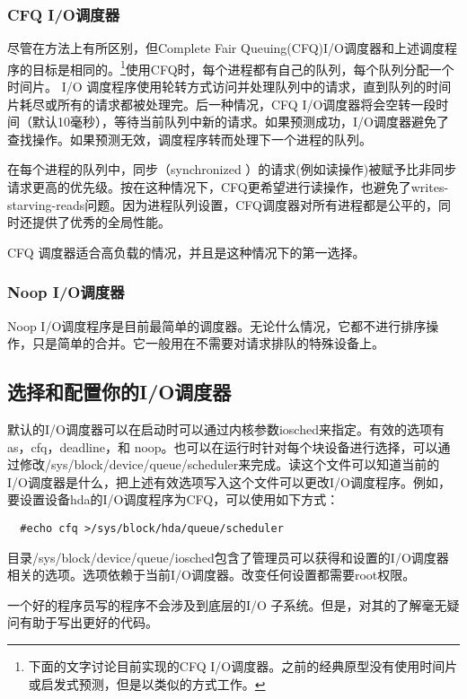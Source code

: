 \subsubsection{CFQ I/O调度器}

尽管在方法上有所区别，但Complete Fair Queuing(CFQ)I/O调度器和上述调度程序的目标是相同的。\footnote[1]{下面的文字讨论目前实现的CFQ I/O调度器。之前的经典原型没有使用时间片或启发式预测，但是以类似的方式工作。}使用CFQ时，每个进程都有自己的队列，每个队列分配一个时间片。 I/O 调度程序使用轮转方式访问并处理队列中的请求，直到队列的时间片耗尽或所有的请求都被处理完。后一种情况，CFQ I/O调度器将会空转一段时间（默认10毫秒），等待当前队列中新的请求。如果预测成功，I/O调度器避免了查找操作。如果预测无效，调度程序转而处理下一个进程的队列。

在每个进程的队列中，同步（synchronized ）的请求(例如读操作)被赋予比非同步请求更高的优先级。按在这种情况下，CFQ更希望进行读操作，也避免了writes-starving-reads问题。因为进程队列设置，CFQ调度器对所有进程都是公平的，同时还提供了优秀的全局性能。

CFQ 调度器适合高负载的情况，并且是这种情况下的第一选择。

\subsubsection{Noop I/O调度器}

Noop I/O调度程序是目前最简单的调度器。无论什么情况，它都不进行排序操作，只是简单的合并。它一般用在不需要对请求排队的特殊设备上。

\subsection{选择和配置你的I/O调度器}

默认的I/O调度器可以在启动时可以通过内核参数iosched来指定。有效的选项有as，cfq，deadline，和 noop。也可以在运行时针对每个块设备进行选择，可以通过修改/sys/block/device/queue/scheduler来完成。读这个文件可以知道当前的I/O调度器是什么，把上述有效选项写入这个文件可以更改I/O调度程序。例如，要设置设备hda的I/O调度程序为CFQ，可以使用如下方式：

\begin{verbatim}
  #echo cfq >/sys/block/hda/queue/scheduler
 \end{verbatim}

目录/sys/block/device/queue/iosched包含了管理员可以获得和设置的I/O调度器相关的选项。选项依赖于当前I/O调度器。改变任何设置都需要root权限。

一个好的程序员写的程序不会涉及到底层的I/O 子系统。但是，对其的了解毫无疑问有助于写出更好的代码。

